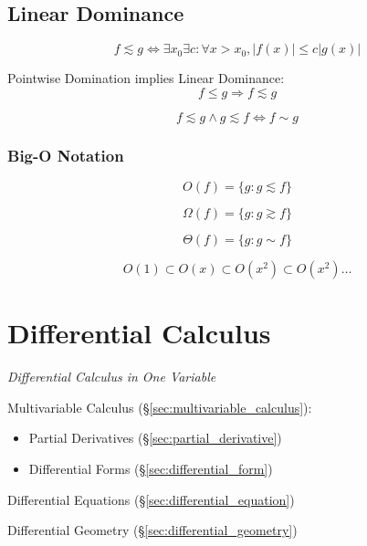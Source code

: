 {%
\subsection{Linear Dominance}\label{sec:linear_dominance}

\[
    f \lesssim g \Leftrightarrow
    \exists x_0 \exists c : \forall x > x_0, |f(x)| \leq c |g(x)|
\]

Pointwise Domination implies Linear Dominance:
\[
    f \leq g \Rightarrow f \lesssim g
\]

\[
    f \lesssim g \wedge g \lesssim f \Leftrightarrow f \sim g
\]



\subsubsection{Big-O Notation}\label{sec:bigo_notation}

\[
    O(f) = \{ g : g \lesssim f \}
\]

\[
    \Omega(f) = \{ g : g \gtrsim f \}
\]

\[
    \Theta(f) = \{ g : g \sim f \}
\]

\[
    O(1) \subset O(x) \subset O(x^2) \subset O(x^2) \ldots
\]



\section{Differential Calculus}\label{sec:differential_calculus}

\emph{Differential Calculus in One Variable}

\fist Multivariable Calculus (\S\ref{sec:multivariable_calculus}):
\begin{itemize}
  \item Partial Derivatives (\S\ref{sec:partial_derivative})
  \item Differential Forms (\S\ref{sec:differential_form})
\end{itemize}

\fist Differential Equations (\S\ref{sec:differential_equation})

\fist Differential Geometry (\S\ref{sec:differential_geometry})

}
